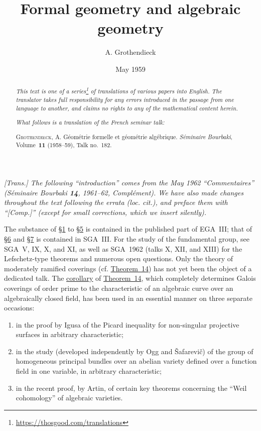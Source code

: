 \documentclass{article}
\title{Formal geometry and algebraic geometry}
\author{A. Grothendieck}
\date{May 1959}
\newcommand{\doctype}{French seminar talk}
\newcommand{\origcit}{%
  \textsc{Grothendieck, A.}
  G\'{e}om\'{e}trie formelle et g\'{e}om\'{e}trie alg\'{e}brique.
  \emph{S\'{e}minaire Bourbaki}, Volume~\textbf{11} (1958--59), Talk no.~182.%
}
\newcommand{\oldpage}[1]{\marginpar{\footnotesize$\Big\vert$ \textit{p.~#1}}}
\begin{document}
\maketitle
\thispagestyle{fancy}

\renewcommand{\abstractname}{Translator's note.}

\begin{abstract}
  \renewcommand*{\thefootnote}{\fnsymbol{footnote}}
  \emph{This text is one of a series\footnote{\url{https://thosgood.com/translations}} of translations of various papers into English.}
  \emph{The translator takes full responsibility for any errors introduced in the passage from one language to another, and claims no rights to any of the mathematical content herein.}

  \medskip
  
  \emph{What follows is a translation of the \doctype:}

  \medskip\noindent
  \origcit
\end{abstract}

\setcounter{footnote}{0}

\tableofcontents



\section*{}

\emph{[Trans.] The following ``introduction'' comes from the May 1962 ``Commentaires'' (\emph{S\'{e}minaire Bourbaki} \textbf{14}, 1961--62, Compl\'{e}ment). We have also made changes throughout the text following the errata (loc. cit.), and preface them with ``[Comp.]'' (except for small corrections, which we insert silently).}

\oldpage{C-03}
The substance of \hyperref[section1]{\S1} to \hyperref[section5]{\S5} is contained in the published part of EGA~III; that of \hyperref[section6]{\S6} and \hyperref[section7]{\S7} is contained in SGA~III.
For the study of the fundamental group, see SGA~V, IX, X, and XI, as well as SGA~1962 (talks X, XII, and XIII) for the Lefschetz-type theorems and numerous open questions.
Only the theory of moderately ramified coverings (cf. \hyperref[theorem14]{Theorem~14}) has not yet been the object of a dedicated talk.
The \hyperref[theorem14corollary1]{corollary} of \hyperref[theorem14]{Theorem~14}, which completely determines Galois coverings of order prime to the characteristic of an algebraic curve over an algebraically closed field, has been used in an essential manner on three separate occasions:
\begin{enumerate}[1.]
  \item in the proof by Igusa of the Picard inequality for non-singular projective surfaces in arbitrary characteristic;
  \item in the study (developed independently by Ogg and \v{S}afarevi\v{c}) of the group of homogeneous principal bundles over an abelian variety defined over a function field in one variable, in arbitrary characteristic;
  \item in the recent proof, by Artin, of certain key theorems concerning the ``Weil cohomology'' of algebraic varieties.
\end{enumerate}
\end{document}
